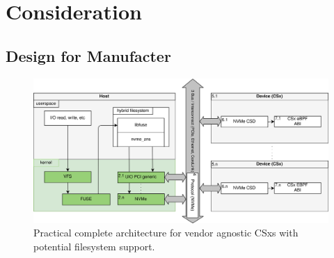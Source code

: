 
\chapter{Consideration} %



\ifpdf
    \graphicspath{{7/figures/PNG/}{7/figures/PDF/}{7/figures/}}
\else
    \graphicspath{{7/figures/EPS/}{7/figures/}}
\fi


\section{Design for Manufacter}



\begin{figure}
    \centering
	\includegraphics[width=1\textwidth]{resources/images/loader-pfs-arch-v3.png}
	\caption{Practical complete architecture for vendor agnostic CSxs with
        potential filesystem support.}
    \label{figure:practicalarchitecture}
\end{figure}

